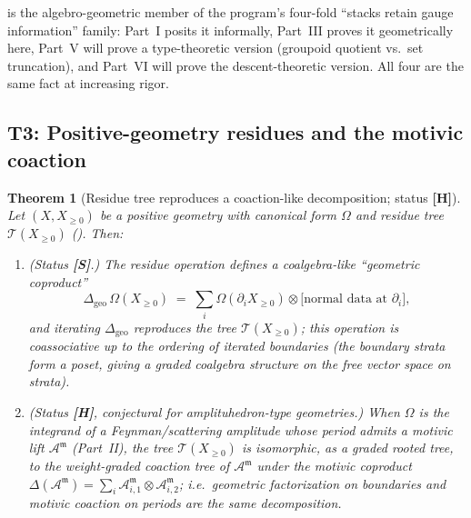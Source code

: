 \documentclass[12pt]{article}
\newtheorem{theorem}{Theorem}[section]
\theoremstyle{definition}
\theoremstyle{remark}
\newcommand{\amp}{\mathcal{A}}
\newcommand{\status}[1]{\textnormal{\textsf{\textbf{[#1]}}}}
\begin{document}
 is the algebro-geometric member of the program's four-fold ``stacks retain gauge
information'' family: Part~I posits it informally, Part~III proves it geometrically here, Part~V will
prove a type-theoretic version (groupoid quotient vs.\ set truncation), and Part~VI will prove the
descent-theoretic version. All four are the same fact at increasing rigor.

\subsection{T3: Positive-geometry residues and the motivic coaction}

\begin{theorem}[Residue tree reproduces a coaction-like decomposition; status \status{H}]
\label{thm:posgeom}
Let $(X,X_{\ge 0})$ be a positive geometry with canonical form $\Omega$ and residue tree
$\mathcal T(X_{\ge 0})$ (). Then:
\begin{enumerate}
  \item (Status \status{S}.) The residue operation defines a coalgebra-like ``geometric coproduct''
  \[
    \Delta_{\mathrm{geo}}\,\Omega(X_{\ge 0}) \;=\; \sum_i \Omega(\partial_i X_{\ge 0}) \otimes
    \bigl[\text{normal data at }\partial_i\bigr],
  \]
  and iterating $\Delta_{\mathrm{geo}}$ reproduces the tree $\mathcal T(X_{\ge 0})$; this operation is
  coassociative up to the ordering of iterated boundaries (the boundary strata form a poset, giving a
  graded coalgebra structure on the free vector space on strata).
  \item (Status \status{H}, conjectural for amplituhedron-type geometries.) When $\Omega$ is the
  integrand of a Feynman/scattering amplitude whose period admits a motivic lift
  $\amp^{\mathfrak m}$ (Part~II), the tree $\mathcal T(X_{\ge 0})$ is isomorphic, as a graded rooted
  tree, to the weight-graded coaction tree of $\amp^{\mathfrak m}$ under the motivic coproduct
  $\Delta(\amp^{\mathfrak m})=\sum_i \amp^{\mathfrak m}_{i,1}\otimes\amp^{\mathfrak m}_{i,2}$; i.e.\
  geometric factorization on boundaries and motivic coaction on periods are the same decomposition.
\end{enumerate}
\end{theorem}
\end{document}
